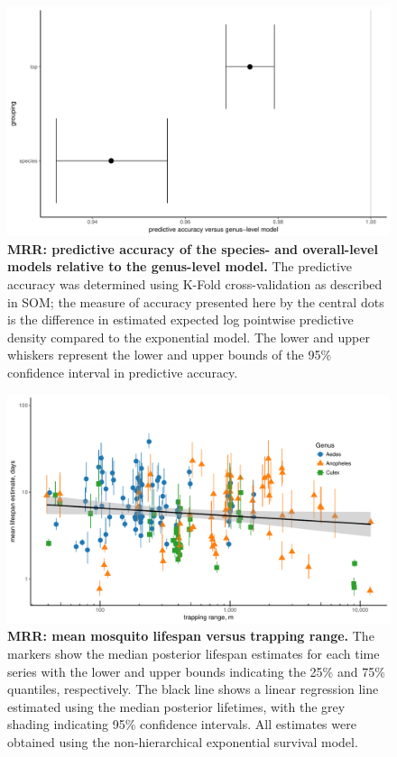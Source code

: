 \documentclass[12pt]{article}
\begin{document}
\begin{figure}[h]
	\centerline{\includegraphics[width=1\textwidth]{./Figure_files/mrr_genus_vs_species_vs_top.pdf}}
	\caption{\textbf{MRR: predictive accuracy of the species- and overall-level models relative to the genus-level model.} The predictive accuracy was determined using K-Fold cross-validation as described in SOM; the measure of accuracy presented here by the central dots is the difference in estimated expected log pointwise predictive density compared to the exponential model. The lower and upper whiskers represent the lower and upper bounds of the 95\% confidence interval in predictive accuracy.}
	\label{fig:mrr_genusTopLevel}
\end{figure}

\begin{figure}[h]
	\centerline{\includegraphics[width=1\textwidth]{./Figure_files/mrr_lifeSpanVsRange.pdf}}
	\caption{\textbf{MRR: mean mosquito lifespan versus trapping range.} The markers show the median posterior lifespan estimates for each time series with the lower and upper bounds indicating the 25\% and 75\% quantiles, respectively. The black line shows a linear regression line estimated using the median posterior lifetimes, with the grey shading indicating 95\% confidence intervals. All estimates were obtained using the non-hierarchical exponential survival model.}
	\label{fig:mrr_lifeSpanVsRange}
\end{figure}
\end{document}
